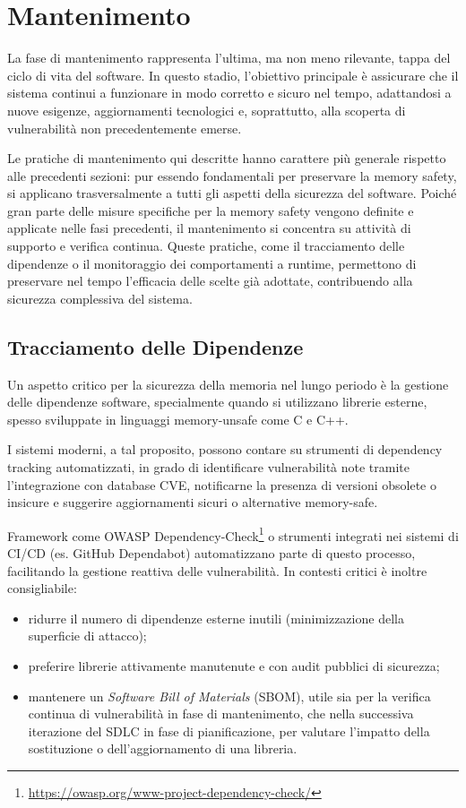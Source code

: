 \section{Mantenimento}
\label{sec:maintenance}

La fase di mantenimento rappresenta l'ultima, ma non meno rilevante, tappa del ciclo
di vita del software. In questo stadio, l'obiettivo principale è assicurare che il
sistema continui a funzionare in modo corretto e sicuro nel tempo, adattandosi a
nuove esigenze, aggiornamenti tecnologici e, soprattutto, alla scoperta di vulnerabilità
non precedentemente emerse.

Le pratiche di mantenimento qui descritte hanno carattere più generale rispetto alle
precedenti sezioni: pur essendo fondamentali per preservare la memory safety, si
applicano trasversalmente a tutti gli aspetti della sicurezza del software.
Poiché gran parte delle misure specifiche per la memory safety vengono definite
e applicate nelle fasi precedenti, il mantenimento si concentra su attività di supporto
e verifica continua. Queste pratiche, come il tracciamento delle dipendenze o il
monitoraggio dei comportamenti a runtime, permettono di preservare nel tempo l'efficacia
delle scelte già adottate, contribuendo alla sicurezza complessiva del sistema.

\subsection{Tracciamento delle Dipendenze}
\label{sec:tracciamento-dipendenze}

Un aspetto critico per la sicurezza della memoria nel lungo periodo è la
gestione delle dipendenze software, specialmente quando si utilizzano librerie esterne,
spesso sviluppate in linguaggi memory-unsafe come C e C++.

I sistemi moderni, a tal proposito, possono contare su strumenti di dependency
tracking automatizzati, in grado di identificare vulnerabilità note tramite l'integrazione
con database CVE, notificarne la presenza di versioni obsolete o insicure e
suggerire aggiornamenti sicuri o alternative memory-safe.

Framework come OWASP Dependency-Check\footnote{\url{https://owasp.org/www-project-dependency-check/}}
o strumenti integrati nei sistemi di CI/CD (es. GitHub Dependabot) automatizzano
parte di questo processo, facilitando la gestione reattiva delle vulnerabilità.
In contesti critici è inoltre consigliabile:
\begin{itemize}
  \item ridurre il numero di dipendenze esterne inutili (minimizzazione della
    superficie di attacco);

  \item preferire librerie attivamente manutenute e con audit pubblici di sicurezza;

  \item mantenere un \textit{Software Bill of Materials} (SBOM), utile sia per la
    verifica continua di vulnerabilità in fase di mantenimento, che nella
    successiva iterazione del SDLC in fase di pianificazione, per valutare l'impatto
    della sostituzione o dell'aggiornamento di una libreria.
\end{itemize}

